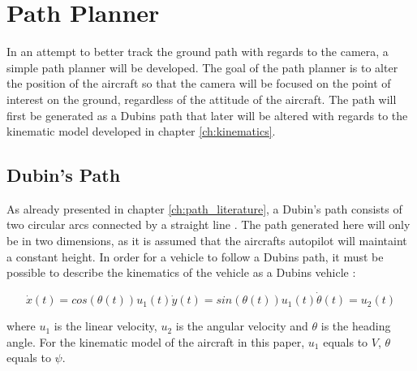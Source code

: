 \section{Path Planner}

In an attempt to better track the ground path with regards to the camera, a simple path planner will be developed. The goal of the path planner is to alter the position of the aircraft so that the camera will be focused on the point of interest on the ground, regardless of the attitude of the aircraft. The path will first be generated as a Dubins path that later will be altered with regards to the kinematic model developed in chapter \ref{ch:kinematics}.


\subsection{Dubin's Path}

As already presented in chapter \ref{ch:path_literature}, a Dubin's path consists of two circular arcs connected by a straight line \cite{DUBIN}. The path generated here will only be in two dimensions, as it is assumed that the aircrafts autopilot will maintaint a constant height. In order for a vehicle to follow a Dubins path, it must be possible to describe the kinematics of the vehicle as a Dubins vehicle \cite{dubinYONG}:

\begin{subequations}
\begin{equation}
	\dot{x}(t) = cos(\theta(t))u_1(t)
\end{equation}
\begin{equation}
	\dot{y}(t) = sin(\theta(t))u_1(t)
\end{equation}
\begin{equation}
	\dot{\theta}(t) = u_2(t)
\end{equation}
\end{subequations}

where $u_1$ is the linear velocity, $u_2$ is the angular velocity and $\theta$ is the heading angle. For the kinematic model of the aircraft in this paper, $u_1$ equals to $V$, $\theta$ equals to $\psi$.

